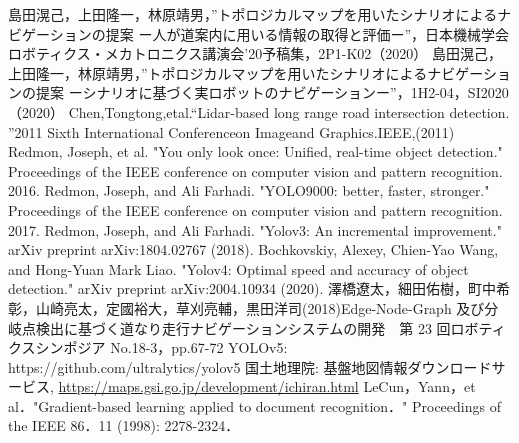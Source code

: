 \documentclass[../main]{subfiles}
\begin{document}
\begin{thebibliography}{99}
 島田滉己，上田隆一，林原靖男，”トポロジカルマップを用いたシナリオによるナビゲーションの提案 ー人が道案内に用いる情報の取得と評価ー”，日本機械学会ロボティクス・メカトロニクス講演会'20予稿集，2P1-K02（2020）
 島田滉己，上田隆一，林原靖男，”トポロジカルマップを用いたシナリオによるナビゲーションの提案 ーシナリオに基づく実ロボットのナビゲーションー”，1H2-04，SI2020（2020）
 Chen,Tongtong,etal.“Lidar-based long range road intersection detection. ”2011 Sixth International Conferenceon Imageand Graphics.IEEE,(2011)
 Redmon, Joseph, et al. "You only look once: Unified, real-time object detection." Proceedings of the IEEE conference on computer vision and pattern recognition. 2016.
 Redmon, Joseph, and Ali Farhadi. "YOLO9000: better, faster, stronger." Proceedings of the IEEE conference on computer vision and pattern recognition. 2017.
 Redmon, Joseph, and Ali Farhadi. "Yolov3: An incremental improvement." arXiv preprint arXiv:1804.02767 (2018).
 Bochkovskiy, Alexey, Chien-Yao Wang, and Hong-Yuan Mark Liao. "Yolov4: Optimal speed and accuracy of object detection." arXiv preprint arXiv:2004.10934 (2020).
 澤橋遼太，細田佑樹，町中希彰，山崎亮太，定國裕大，草刈亮輔，黒田洋司(2018)Edge-Node-Graph 及び分岐点検出に基づく道なり走行ナビゲーションシステムの開発　第 23 回ロボティクスシンポジア No.18-3，pp.67-72
 YOLOv5: https://github.com/ultralytics/yolov5
 国土地理院: 基盤地図情報ダウンロードサービス, \url{https://maps.gsi.go.jp/development/ichiran.html}
 LeCun，Yann，et al．"Gradient-based learning applied to document recognition．" Proceedings of the IEEE 86．11 (1998): 2278-2324．
\end{thebibliography}
\end{document}
